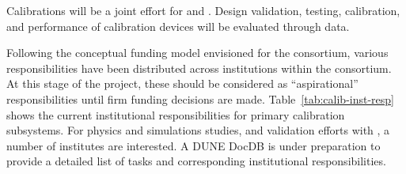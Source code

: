 


Calibrations %
will be a joint effort for \single and \dual. Design validation, testing, calibration, and performance of calibration devices will be evaluated through  data.

Following the conceptual funding model envisioned for the consortium, various responsibilities have been distributed across institutions within the consortium. At this stage of the project, these should be considered as ``aspirational'' responsibilities until firm funding decisions are made. Table~\ref{tab:calib-inst-resp} shows the current institutional responsibilities for primary calibration subsystems. 
For physics and simulations studies, and validation efforts with , a number of institutes are interested. A 
DUNE DocDB is under preparation to provide a detailed list of tasks and corresponding institutional responsibilities.


\begin{comment}
\begin{dunetable}
[Institutional responsibility for calibrations]
{p{0.25\textwidth}p{0.65\textwidth}}
{tab:calib-inst-resp}
{Institutional responsibilities in the Calibration Consortium}   
System & Institutional Responsibility \\ \toprowrule
Laser System & Bern, Hawaii, LIP, Pitt, UTK \\ \colhline
Pulsed Neutron Source & BU, CSU, UC Davis, Iowa, LIP, MSU, SDSMT \\ \colhline
\end{dunetable}
\end{comment}

